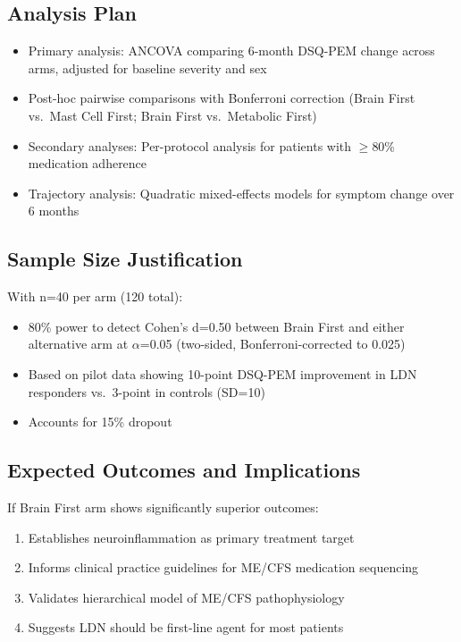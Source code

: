 \subsection{Analysis Plan}

\begin{itemize}
    \item Primary analysis: ANCOVA comparing 6-month DSQ-PEM change across arms, adjusted for baseline severity and sex
    \item Post-hoc pairwise comparisons with Bonferroni correction (Brain First vs.\ Mast Cell First; Brain First vs.\ Metabolic First)
    \item Secondary analyses: Per-protocol analysis for patients with $\geq$80\% medication adherence
    \item Trajectory analysis: Quadratic mixed-effects models for symptom change over 6 months
\end{itemize}

\subsection{Sample Size Justification}

With n=40 per arm (120 total):
\begin{itemize}
    \item 80\% power to detect Cohen's d=0.50 between Brain First and either alternative arm at $\alpha$=0.05 (two-sided, Bonferroni-corrected to 0.025)
    \item Based on pilot data showing 10-point DSQ-PEM improvement in LDN responders vs.\ 3-point in controls (SD=10)
    \item Accounts for 15\% dropout
\end{itemize}

\subsection{Expected Outcomes and Implications}

If Brain First arm shows significantly superior outcomes:
\begin{enumerate}
    \item Establishes neuroinflammation as primary treatment target
    \item Informs clinical practice guidelines for ME/CFS medication sequencing
    \item Validates hierarchical model of ME/CFS pathophysiology
    \item Suggests LDN should be first-line agent for most patients
\end{enumerate}

